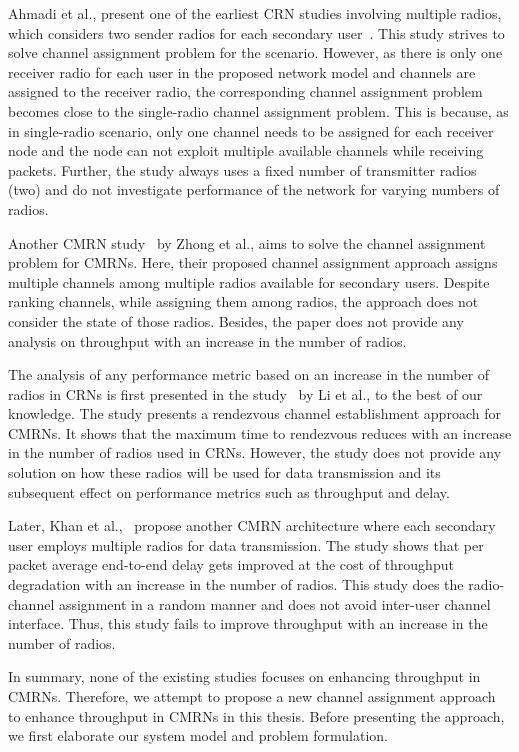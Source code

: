 Ahmadi et al., present one of the earliest CRN studies involving multiple radios, which considers two sender radios for each secondary user~\cite{ahmadi2012distributed}. This study strives to solve channel assignment problem for the scenario. However, as there is only one receiver radio for each user in the proposed network model and channels are assigned to the receiver radio, the corresponding channel assignment problem becomes close to the single-radio channel assignment problem. This is because, as in single-radio scenario, only one channel needs to be assigned for each receiver node and the node can not exploit multiple available channels while receiving packets. Further, the study always uses a fixed number of transmitter radios (two) and do not investigate performance of the network for varying numbers of radios.

Another CMRN study~\cite{zhong2014capacity} by Zhong et al., aims to solve the channel assignment problem for CMRNs. Here, their proposed channel assignment approach assigns multiple channels among multiple radios available for secondary users. Despite ranking channels, while assigning them among radios, the approach does not consider the state of those radios. Besides, the paper does not provide any analysis on throughput with an increase in the number of radios.

The analysis of any performance metric based on an increase in the number of radios in CRNs is first presented in the study~\cite{li2014deterministic} by Li et al., to the best of our knowledge. The study presents a rendezvous channel establishment approach for CMRNs. It shows that the maximum time to rendezvous reduces with an increase in the number of radios used in CRNs. However, the study does not provide any solution on how these radios will be used for data transmission and its subsequent effect on performance metrics such as throughput and delay.

Later, Khan et al.,~\cite{khan2015towards} propose another CMRN architecture where each secondary user employs multiple radios for data transmission. The study shows that per packet average end-to-end delay gets improved at the cost of throughput degradation with an increase in the number of radios. This study does the radio-channel assignment in a random manner and does not avoid inter-user channel interface. Thus, this study fails to improve throughput with an increase in the number of radios.

In summary, none of the existing studies focuses on enhancing throughput in CMRNs. Therefore, we attempt to propose a new channel assignment approach to enhance throughput in CMRNs in this thesis. Before presenting the approach, we first elaborate our system model and problem formulation.
\endinput

